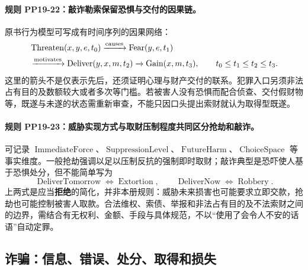 \paragraph{规则 PP19-22：敲诈勒索保留恐惧与交付的因果链。}
\mbox{}\par
原书行为模型可写成有时间序列的因果网络：
\[
\begin{aligned}
&\operatorname{Threaten}(x,y,e,t_0)
\xrightarrow{\rm causes}\operatorname{Fear}(y,e,t_1)\\
&\quad\xrightarrow{\rm motivates}\operatorname{Deliver}(y,x,m,t_2)
\xrightarrow{}\operatorname{Gain}(x,m,t_3),
\qquad t_0\le t_1\le t_2\le t_3.
\end{aligned}
\]
这里的箭头不是仅表示先后，还须证明心理与财产交付的联系。犯罪入口另须非法占有目的及数额较大或者多次等门槛。若被害人没有恐惧而配合侦查、交付假财物等，既遂与未遂的状态需重新审查，不能只因口头提出索财就认为取得型既遂。

\paragraph{规则 PP19-23：威胁实现方式与取财压制程度共同区分抢劫和敲诈。}
\mbox{}\par
可记录 $\operatorname{ImmediateForce}$、$\operatorname{SuppressionLevel}$、$\operatorname{FutureHarm}$、$\operatorname{ChoiceSpace}$ 等事实维度。一般抢劫强调以足以压制反抗的强制即时取财；敲诈典型是恐吓使人基于恐惧处分，但不能简单写为
\[
\operatorname{DeliverTomorrow}\Longleftrightarrow\operatorname{Extortion},
\qquad
\operatorname{DeliverNow}\Longleftrightarrow\operatorname{Robbery}.
\]
上两式是应当\textbf{拒绝}的简化，并非本册规则：威胁未来损害也可能要求立即交款，抢劫也可能控制被害人取款。合法维权、索债、举报和非法占有目的及不法索财之间的边界，需结合有无权利、金额、手段与具体规范，不以“使用了会令人不安的话语”自动定罪。

\subsection{诈骗：信息、错误、处分、取得和损失}
